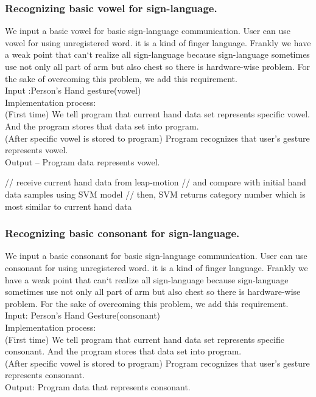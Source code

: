 \documentclass[10pt,journal,compsoc]{IEEEtran}
\begin{document}
\subsubsection {Recognizing basic vowel for sign-language.\\}

We input a basic vowel for basic sign-language communication. User can use vowel for using unregistered word. it is a kind of finger language. Frankly we have a weak point that can`t realize all sign-language because sign-language sometimes use not only all part of arm but also chest so there is hardware-wise problem. For the sake of overcoming this problem, we add this requirement.
\\Input :Person's Hand gesture(vowel)
\\Implementation process:
\\(First time) We tell program that current hand data set represents specific vowel. And the program stores that data set into program.
\\(After specific vowel is stored to program) Program recognizes that user’s gesture represents vowel.
\\Output – Program data represents vowel.

// receive current hand data from leap-motion
// and compare with initial hand data samples using SVM model
// then, SVM returns category number which is most similar to current hand data


\subsubsection{ Recognizing basic consonant for sign-language.\\}

We input a basic consonant for basic sign-language communication. User can use consonant for using unregistered word. it is a kind of finger language. Frankly we have a weak point that can`t realize all sign-language because sign-language sometimes use not only all part of arm but also chest so there is hardware-wise problem. For the sake of overcoming this problem, we add this requirement.
\\Input: Person's Hand Gesture(consonant)
\\Implementation process:
\\(First time) We tell program that current hand data set represents specific consonant. And the program stores that data set into program.
\\(After specific vowel is stored to program) Program recognizes that user’s gesture represents consonant.
\\Output: Program data that represents consonant.
\end{document}
